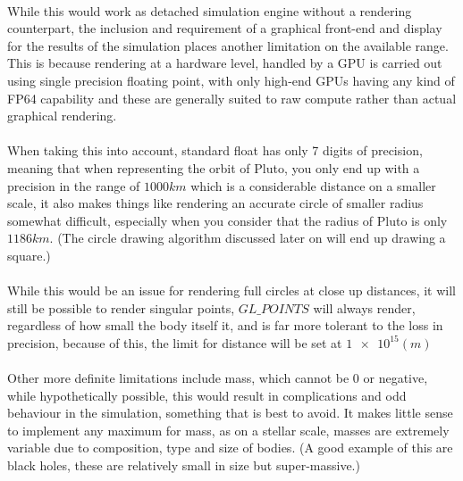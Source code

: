 \paragraph{}
While this would work as detached simulation engine without a rendering counterpart, the inclusion and requirement of a graphical front-end and display for the results of the simulation places another limitation on the available range. This is because rendering at a hardware level, handled by a GPU is carried out using single precision floating point, with only high-end GPUs having any kind of FP64 capability and these are generally suited to raw compute rather than actual graphical rendering.

\paragraph{}
When taking this into account, standard float has only 7 digits of precision, meaning that when representing the orbit of Pluto, you only end up with a precision in the range of $1000 km$ which is a considerable distance on a smaller scale, it also makes things like rendering an accurate circle of smaller radius somewhat difficult, especially when you consider that the radius of Pluto is only $1186 km$. (The circle drawing algorithm discussed later on will end up drawing a square.)

\paragraph{}
While this would be an issue for rendering full circles at close up distances, it will still be possible to render singular points, $GL\_POINTS$ will always render, regardless of how small the body itself it, and is far more tolerant to the loss in precision, because of this, the limit for distance will be set at $\num{1e15} (m)$

\paragraph{}
Other more definite limitations include mass, which cannot be 0 or negative, while hypothetically possible, this would result in complications and odd behaviour in the simulation, something that is best to avoid. It makes little sense to implement any maximum for mass, as on a stellar scale, masses are extremely variable due to composition, type and size of bodies. (A good example of this are black holes, these are relatively small in size but super-massive.)

